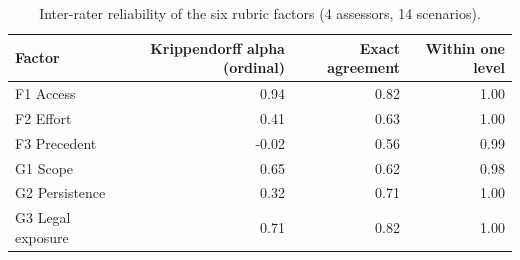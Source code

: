 \begin{table}[t]
\centering\small
\caption{Inter-rater reliability of the six rubric factors (4 assessors, 14 scenarios).}
\label{tab:irr}
\begin{tabular}{lrrr}
\toprule
Factor & Krippendorff alpha (ordinal) & Exact agreement & Within one level \\
\midrule
F1 Access & 0.94 & 0.82 & 1.00 \\
F2 Effort & 0.41 & 0.63 & 1.00 \\
F3 Precedent & -0.02 & 0.56 & 0.99 \\
G1 Scope & 0.65 & 0.62 & 0.98 \\
G2 Persistence & 0.32 & 0.71 & 1.00 \\
G3 Legal exposure & 0.71 & 0.82 & 1.00 \\
\bottomrule
\end{tabular}
\end{table}
